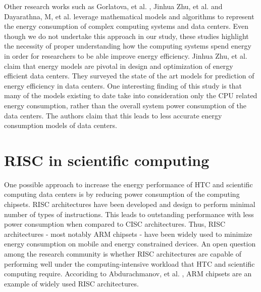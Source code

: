 Other research works such as Gorlatova, et al. \cite{ENERGY_ALGORITHMS}, Jinhua Zhu, et al. \cite{MODEL1} and Dayarathna, M, et al. \cite{MODEL2} leverage mathematical models and algorithms to represent the energy consumption of complex computing systems and data centers. Even though we do not undertake this approach in our study, these studies highlight the necessity of proper understanding how the computing systems spend energy in order for researchers to be able improve energy efficiency. Jinhua Zhu, et al. \cite{MODEL1} claim that energy models are pivotal in design and optimization of energy efficient data centers. They surveyed the state of the art models for prediction of energy efficiency in data centers. One interesting finding of this study is that many of the models existing to date take into consideration only the CPU related energy consumption, rather than the overall system power consumption of the data centers. The authors claim that this leads to less accurate energy consumption models of data centers. 



\section{RISC in scientific computing} %

One possible approach to increase the energy performance of HTC and scientific computing data centers is by reducing power consumption of the computing chipsets. RISC architectures have been developed and design to perform minimal number of types of instructions. This leads to outstanding performance with less power consumption when compared to CISC architectures. Thus, RISC architectures - most notably ARM chipsets - have been widely used to minimize energy consumption on mobile and energy constrained devices. An open question among the research community is whether RISC architectures are capable of performing well under the computing-intensive workload that HTC and scientific computing require. Accoriding to Abdurachmanov, et al. \cite{ARM}, ARM chipsets are an example of widely used RISC architectures.

